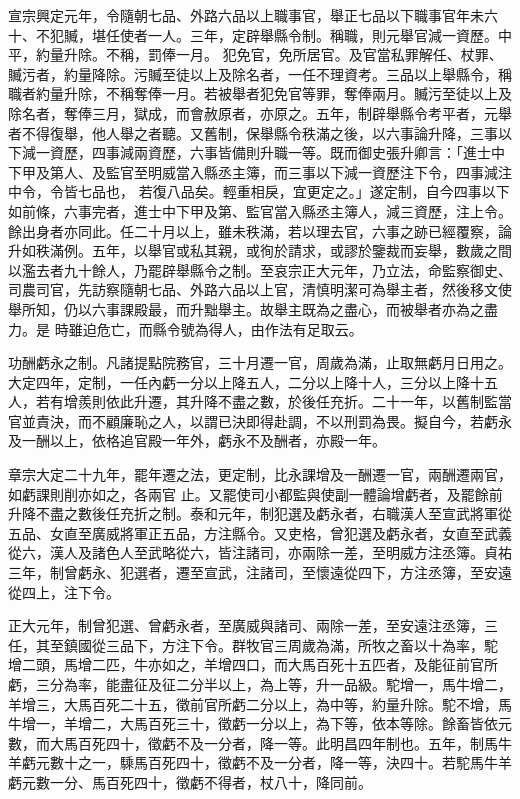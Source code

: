 \begin{pinyinscope}
 宣宗興定元年，令隨朝七品、外路六品以上職事官，舉正七品以下職事官年未六十、不犯贓，堪任使者一人。三年，定辟舉縣令制。稱職，則元舉官減一資歷。中平，約量升除。不稱，罰俸一月。
 犯免官，免所居官。及官當私罪解任、杖罪、贓污者，約量降除。污贓至徒以上及除名者，一任不理資考。三品以上舉縣令，稱職者約量升除，不稱奪俸一月。若被舉者犯免官等罪，奪俸兩月。贓污至徒以上及除名者，奪俸三月，獄成，而會赦原者，亦原之。五年，制辟舉縣令考平者，元舉者不得復舉，他人舉之者聽。又舊制，保舉縣令秩滿之後，以六事論升降，三事以下減一資歷，四事減兩資歷，六事皆備則升職一等。既而御史張升卿言：「進士中下甲及第人、及監官至明威當入縣丞主簿，而三事以下減一資歷注下令，四事減注中令，令皆七品也，
 若復八品矣。輕重相戾，宜更定之。」遂定制，自今四事以下如前條，六事完者，進士中下甲及第、監官當入縣丞主簿人，減三資歷，注上令。餘出身者亦同此。任二十月以上，雖未秩滿，若以理去官，六事之跡已經覆察，論升如秩滿例。五年，以舉官或私其親，或徇於請求，或謬於鑒裁而妄舉，數歲之間以濫去者九十餘人，乃罷辟舉縣令之制。至哀宗正大元年，乃立法，命監察御史、司農司官，先訪察隨朝七品、外路六品以上官，清慎明潔可為舉主者，然後移文使舉所知，仍以六事課殿最，而升黜舉主。故舉主既為之盡心，而被舉者亦為之盡力。是
 時雖迫危亡，而縣令號為得人，由作法有足取云。



 功酬虧永之制。凡諸提點院務官，三十月遷一官，周歲為滿，止取無虧月日用之。大定四年，定制，一任內虧一分以上降五人，二分以上降十人，三分以上降十五人，若有增羨則依此升遷，其升降不盡之數，於後任充折。二十一年，以舊制監當官並責決，而不顧廉恥之人，以謂已決即得赴調，不以刑罰為畏。擬自今，若虧永及一酬以上，依格追官殿一年外，虧永不及酬者，亦殿一年。



 章宗大定二十九年，罷年遷之法，更定制，比永課增及一酬遷一官，兩酬遷兩官，如虧課則削亦如之，各兩官
 止。又罷使司小都監與使副一體論增虧者，及罷餘前升降不盡之數後任充折之制。泰和元年，制犯選及虧永者，右職漢人至宣武將軍從五品、女直至廣威將軍正五品，方注縣令。又吏格，曾犯選及虧永者，女直至武義從六，漢人及諸色人至武略從六，皆注諸司，亦兩除一差，至明威方注丞簿。貞祐三年，制曾虧永、犯選者，遷至宣武，注諸司，至懷遠從四下，方注丞簿，至安遠從四上，注下令。



 正大元年，制曾犯選、曾虧永者，至廣威與諸司、兩除一差，至安遠注丞簿，三任，其至鎮國從三品下，方注下令。群牧官三周歲為滿，所牧之畜以十為率，駝
 增二頭，馬增二匹，牛亦如之，羊增四口，而大馬百死十五匹者，及能征前官所虧，三分為率，能盡征及征二分半以上，為上等，升一品級。駝增一，馬牛增二，羊增三，大馬百死二十五，徵前官所虧二分以上，為中等，約量升除。駝不增，馬牛增一，羊增二，大馬百死三十，徵虧一分以上，為下等，依本等除。餘畜皆依元數，而大馬百死四十，徵虧不及一分者，降一等。此明昌四年制也。五年，制馬牛羊虧元數十之一，騬馬百死四十，徵虧不及一分者，降一等，決四十。若駝馬牛羊虧元數一分、馬百死四十，徵虧不得者，杖八十，降同前。



\end{pinyinscope}